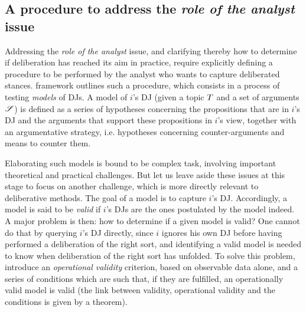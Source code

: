 \documentclass[version=3.21, pagesize, twoside=off, bibliography=totoc, DIV=calc, fontsize=12pt, a4paper, french, english]{scrartcl}
\begin{document}
\subsection{A procedure to address the \emph{role of the analyst} issue}
Addressing the \emph{role of the analyst} issue, and clarifying thereby how to determine if deliberation has reached its aim in practice,  require explicitly defining a procedure to be performed by the analyst who wants to capture deliberated stances.  framework outlines such a procedure, which consists in a process of testing \emph{models} of \acp{DJ}. A model of $i$’s \ac{DJ} (given a topic $T$ and a set of arguments $\mathscr{S}$) is defined as a series of hypotheses concerning the propositions that are in $i$’s \ac{DJ} and the arguments that support these propositions in $i$’s view, together with an argumentative strategy, i.e. hypotheses concerning counter-arguments and means to counter them.

Elaborating such models is bound to be complex task, involving important theoretical and practical challenges. But let us leave aside these issues at this stage to focus on another challenge, which is more directly relevant to deliberative methods. 
The goal of a model is to capture $i$’s \ac{DJ}. Accordingly, a model is said to be \emph{valid} if $i$’s \acp{DJ} are the ones postulated by the model indeed. A major problem is then: how to determine if a given model is valid?
One cannot do that by querying $i$’s \ac{DJ} directly, since $i$ ignores his own \ac{DJ} before having performed a deliberation of the right sort, and identifying a valid model is needed to know when deliberation of the right sort has unfolded. To solve this problem, \citet{cailloux_formal_2019} introduce an \emph{operational validity} criterion, based on observable data alone, and a series of conditions which are such that, if they are fulfilled, an operationally valid model is valid (the link between validity, operational validity and the conditions is given by a theorem).
\end{document}
